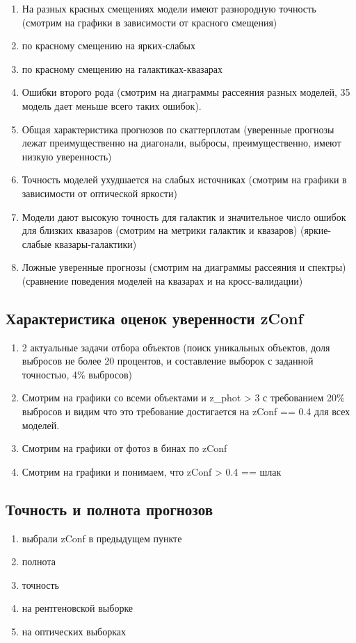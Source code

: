 \documentclass[fleqn,usenatbib]{mnras}
\begin{document}
\begin{enumerate}
	\item На разных красных смещениях модели имеют разнородную точность (смотрим на графики в зависимости от красного смещения)
	\item по красному смещению на ярких-слабых
	\item по красному смещению на галактиках-квазарах
	\item Ошибки второго рода (смотрим на диаграммы рассеяния разных моделей, 35 модель дает меньше всего таких ошибок).
	\item Общая характеристика прогнозов по скаттерплотам (уверенные прогнозы лежат преимущественно на диагонали, выбросы, преимущественно, имеют низкую уверенность)
	\item Точность моделей ухудшается на слабых источниках (смотрим на графики в зависимости от оптической яркости)
	\item Модели дают высокую точность для галактик и значительное число ошибок для близких квазаров (смотрим на метрики галактик и квазаров) (яркие-слабые квазары-галактики)
	\item Ложные уверенные прогнозы (смотрим на диаграммы рассеяния и спектры) (сравнение поведения моделей на квазарах и на кросс-валидации)
\end{enumerate}

\subsection{Характеристика оценок уверенности zConf}\label{ssec:results-zconf}
\begin{enumerate}
	\item 2 актуальные задачи отбора объектов (поиск уникальных объектов, доля выбросов не более 20 процентов, и составление выборок с заданной точностью, 4\% выбросов)
	\item Смотрим на графики со всеми объектами и z\_phot > 3 с требованием 20\% выбросов и видим что это требование достигается на zConf == 0.4 для всех моделей.
	\item Смотрим на графики от фотоз в бинах по zConf 
	\item Смотрим на графики и понимаем, что zConf > 0.4 == шлак
\end{enumerate}

\subsection{Точность и полнота прогнозов}\label{ssec:results-prec-comp}
\begin{enumerate}
	\item выбрали zConf в предыдущем пункте
	\item полнота
	\item точность
	\item на рентгеновской выборке
	\item на оптических выборках
\end{enumerate}
\end{document}
